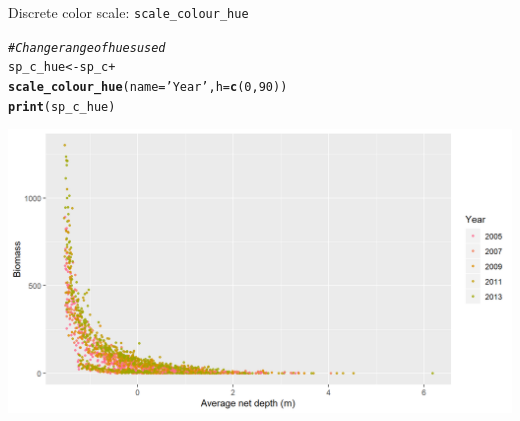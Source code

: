 \documentclass{beamer}\usepackage[]{graphicx}\usepackage[]{color}
\makeatletter
\newcommand{\hlnum}[1]{\textcolor[rgb]{0.686,0.059,0.569}{#1}}%
\newcommand{\hlstr}[1]{\textcolor[rgb]{0.192,0.494,0.8}{#1}}%
\newcommand{\hlcom}[1]{\textcolor[rgb]{0.678,0.584,0.686}{\textit{#1}}}%
\newcommand{\hlopt}[1]{\textcolor[rgb]{0,0,0}{#1}}%
\newcommand{\hlstd}[1]{\textcolor[rgb]{0.345,0.345,0.345}{#1}}%
\newcommand{\hlkwb}[1]{\textcolor[rgb]{0.69,0.353,0.396}{#1}}%
\newcommand{\hlkwc}[1]{\textcolor[rgb]{0.333,0.667,0.333}{#1}}%
\newcommand{\hlkwd}[1]{\textcolor[rgb]{0.737,0.353,0.396}{\textbf{#1}}}%
\newenvironment{kframe}{%
 \def\at@end@of@kframe{}%
 \ifinner\ifhmode%
  \def\at@end@of@kframe{\end{minipage}}%
  \begin{minipage}{\columnwidth}%
 \fi\fi%
 \def\FrameCommand##1{\hskip\@totalleftmargin \hskip-\fboxsep
 \colorbox{shadecolor}{##1}\hskip-\fboxsep
     \hskip-\linewidth \hskip-\@totalleftmargin \hskip\columnwidth}%
 \MakeFramed {\advance\hsize-\width
   \@totalleftmargin\z@ \linewidth\hsize
   \@setminipage}}%
 {\par\unskip\endMakeFramed%
 \at@end@of@kframe}
\newenvironment{knitrout}{}{} %
\makeatother
\begin{document}
\begin{frame}[fragile]{Discrete color scale: \lstinline{scale_colour_hue}}
\begin{knitrout}\footnotesize
{}\color{fgcolor}\begin{kframe}
\begin{alltt}
\hlcom{# Change range of hues used}
\hlstd{sp_c_hue} \hlkwb{<-} \hlstd{sp_c} \hlopt{+}
  \hlkwd{scale_colour_hue}\hlstd{(}\hlkwc{name}\hlstd{=}\hlstr{'Year'}\hlstd{,} \hlkwc{h}\hlstd{=}\hlkwd{c}\hlstd{(}\hlnum{0}\hlstd{,} \hlnum{90}\hlstd{))}
\hlkwd{print}\hlstd{(sp_c_hue)}
\end{alltt}
\end{kframe}

{\centering \includegraphics[width=.9\linewidth]{figure/sp_discrete_color_hue3-1} 

}



\end{knitrout}
\end{frame}
\end{document}
